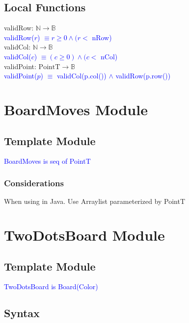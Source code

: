\documentclass[12pt]{article}
\begin{document}
\subsection*{Local Functions}

\noindent validRow: $\mathbb{N} \rightarrow \mathbb{B}$\\
\noindent \textcolor{blue}{validRow($r$) $\equiv r \geq 0 \land (r < $ nRow)} \\

\noindent validCol: $\mathbb{N} \rightarrow \mathbb{B}$\\
\noindent \textcolor{blue}{validCol($c$) $\equiv (c \geq 0) \land (c < $ nCol)} \\


\noindent validPoint: $\mbox{PointT} \rightarrow \mathbb{B}$\\
\noindent \textcolor{blue}{validPoint($p$) $\equiv$ validCol(p.col()) $\land$ validRow(p.row())}

\newpage

\section* {BoardMoves Module}

\subsection* {Template Module}

\noindent \textcolor{blue}{BoardMoves is seq of PointT}

\subsubsection* {Considerations}
When using in Java. Use Arraylist parameterized by PointT


\newpage

\section* {TwoDotsBoard Module}

\subsection* {Template Module}

\noindent \textcolor{blue}{TwoDotsBoard is Board(Color)}

\subsection* {Syntax}
\end{document}
